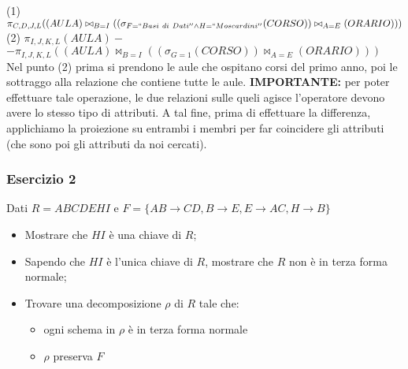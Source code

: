    \noindent(1) $\pi_{C, D, J, L}((AULA)\bowtie_{B=I}((\sigma_{F=``Basi\ di\ Dati'' \wedge H=``Moscardini''}(CORSO))\bowtie_{A=E}(ORARIO)))$\\
   (2) $\pi_{I, J, K, L}(AULA)-$ \\ $- \pi_{I, J, K, L}((AULA)\bowtie_{B=I}((\sigma_{G=1}(CORSO))\bowtie_{A=E}(ORARIO)))$\\

   Nel punto (2) prima si prendono le aule che ospitano corsi del primo anno, poi le sottraggo alla relazione che contiene tutte
   le aule. \textbf{IMPORTANTE:} per poter effettuare tale operazione, le due relazioni sulle queli agisce l'operatore devono avere
   lo stesso tipo di attributi. A tal fine, prima di effettuare la differenza, applichiamo la proiezione su entrambi i membri per far
   coincidere gli attributi (che sono poi gli attributi da noi cercati).
  \subsubsection{Esercizio 2}
 Dati $R=ABCDEHI$ e $F=\{AB\rightarrow CD, B\rightarrow E, E\rightarrow AC, H\rightarrow B\}$
 \begin{itemize}
  \item Mostrare che $HI$ è una chiave di $R$;
  \item Sapendo che $HI$ è l'unica  chiave di $R$, mostrare che $R$ non è in terza forma normale;
  \item Trovare una decomposizione $\rho$ di $R$ tale che:
    \begin{itemize}
     \item ogni schema in $\rho$ è in terza forma normale
    \item $\rho$ preserva $F$
    \end{itemize}
 \end{itemize}
 

